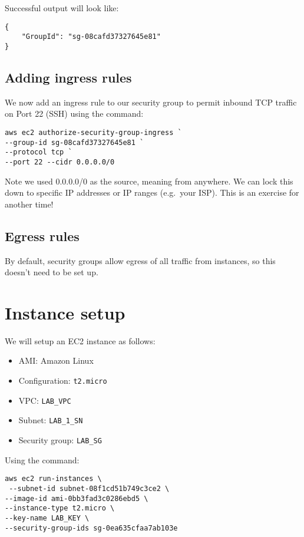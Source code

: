 Successful output will look like:

\begin{verbatim}
{
    "GroupId": "sg-08cafd37327645e81"
}
\end{verbatim}

\subsection{Adding ingress rules}\label{adding-ingress-rules}

We now add an ingress rule to our security group to permit inbound TCP
traffic on Port 22 (SSH) using the command:

\begin{verbatim}
aws ec2 authorize-security-group-ingress `
--group-id sg-08cafd37327645e81 `
--protocol tcp `
--port 22 --cidr 0.0.0.0/0
\end{verbatim}

Note we used 0.0.0.0/0 as the source, meaning from anywhere. We can lock
this down to specific IP addresses or IP ranges (e.g.~your ISP). This is
an exercise for another time!

\subsection{Egress rules}\label{egress-rules}

By default, security groups allow egress of all traffic from instances,
so this doesn't need to be set up.

\section{Instance setup}\label{instance-setup}

We will setup an EC2 instance as follows:

\begin{itemize}
\item
  AMI: Amazon Linux
\item
  Configuration: \texttt{t2.micro}
\item
  VPC: \texttt{LAB\_VPC}
\item
  Subnet: \texttt{LAB\_1\_SN}
\item
  Security group: \texttt{LAB\_SG}
\end{itemize}

Using the command:

\begin{verbatim}
aws ec2 run-instances \
 --subnet-id subnet-08f1cd51b749c3ce2 \
--image-id ami-0bb3fad3c0286ebd5 \
--instance-type t2.micro \
--key-name LAB_KEY \
--security-group-ids sg-0ea635cfaa7ab103e
\end{verbatim}

